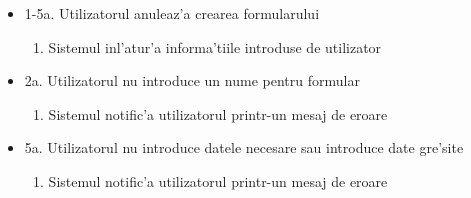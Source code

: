 \documentclass[12pt,a4paper,twoside]{report}
\begin{document}
\begin{itemize}
    \item 1-5a. Utilizatorul anuleaz'a crearea formularului
        \begin{enumerate}
            \item Sistemul inl'atur'a informa'tiile introduse de utilizator
        \end{enumerate}
    \item 2a. Utilizatorul nu introduce un nume pentru formular
        \begin{enumerate}
            \item Sistemul notific'a utilizatorul printr-un mesaj de eroare
        \end{enumerate}
    \item 5a. Utilizatorul nu introduce datele necesare sau introduce date gre'site
      \begin{enumerate}
            \item Sistemul notific'a utilizatorul printr-un mesaj de eroare
            \end{enumerate}
\end{itemize}
\end{document}

